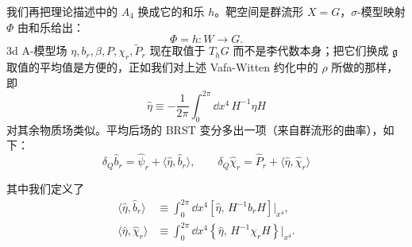 
我们再把理论描述中的 $A_4$ 换成它的和乐 $h$。靶空间是群流形 $X=G$，$\sigma$-模型映射 $\Phi$ 由和乐给出：
\[
    \Phi = h : W \to G .
\]
3d A-模型场 $\eta,b_r,\beta,P,\chi_r,\tilde P_r$ 现在取值于 $T_hG$ 而不是李代数本身；把它们换成 $\mathfrak{g}$ 取值的平均值是方便的，正如我们对上述 Vafa-Witten 约化中的 $\rho$ 所做的那样，即
\[
    \hat\eta \equiv -\frac{1}{2\pi}\int_0^{2\pi}\dd x^4\, H^{-1}\eta H
\]
对其余物质场类似。平均后场的 BRST 变分多出一项（来自群流形的曲率），如下：
\[
    \delta_Q\hat b_r = \hat\psi_r + \langle\hat\eta,\hat b_r\rangle, \qquad
    \delta_Q\hat\chi_r = \hat P_r + \langle\hat\eta,\hat\chi_r\rangle
\]

其中我们定义了
\begin{align*}
    \langle\hat\eta,\hat b_r\rangle &\equiv \int_0^{2\pi}\dd x^4
        \left[\hat\eta,\, H^{-1}b_rH\right]\Big|_{x^4}, \\
    \langle\hat\eta,\hat\chi_r\rangle &\equiv \int_0^{2\pi}\dd x^4
        \left\{\hat\eta,\, H^{-1}\chi_rH\right\}\Big|_{x^4} .
\end{align*}


